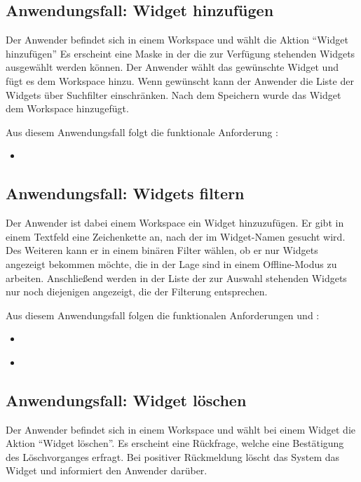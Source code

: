 \subsection{Anwendungsfall: Widget hinzufügen}
Der Anwender befindet sich in einem Workspace und wählt die Aktion "`Widget hinzufügen"' Es erscheint eine Maske in der die zur Verfügung stehenden Widgets ausgewählt werden können. Der Anwender wählt das gewünschte Widget und fügt es dem Workspace hinzu. Wenn gewünscht kann der Anwender die Liste der Widgets über Suchfilter einschränken. Nach dem Speichern wurde das Widget dem Workspace hinzugefügt.

Aus diesem Anwendungsfall folgt die funktionale Anforderung :
\begin{itemize}
 \item \requirementf{\requirementWidgetAdd}\label{requirementWidgetAdd}
\end{itemize}

\subsection{Anwendungsfall: Widgets filtern}
Der Anwender ist dabei einem Workspace ein Widget hinzuzufügen. Er gibt in einem Textfeld eine Zeichenkette an, nach der im Widget-Namen gesucht wird. Des Weiteren kann er in einem binären Filter wählen, ob er nur Widgets angezeigt bekommen möchte, die in der Lage sind in einem Offline-Modus zu arbeiten. Anschließend werden in der Liste der zur Auswahl stehenden Widgets nur noch diejenigen angezeigt, die der Filterung entsprechen.
 
Aus diesem Anwendungsfall folgen die funktionalen Anforderungen  und :
\begin{itemize}
 \item \requirementf{\requirementWidgetFilterName}\label{requirementWidgetFilterName}
 \item \requirementf{\requirementWidgetFilterOnline}\label{requirementWidgetFilterOnline}
\end{itemize}
 
\subsection{Anwendungsfall: Widget löschen}
Der Anwender befindet sich in einem Workspace und wählt bei einem Widget die Aktion "`Widget löschen"'. Es erscheint eine Rückfrage, welche eine Bestätigung des Löschvorganges erfragt. Bei positiver Rückmeldung löscht das System das Widget und informiert den Anwender darüber.
 
